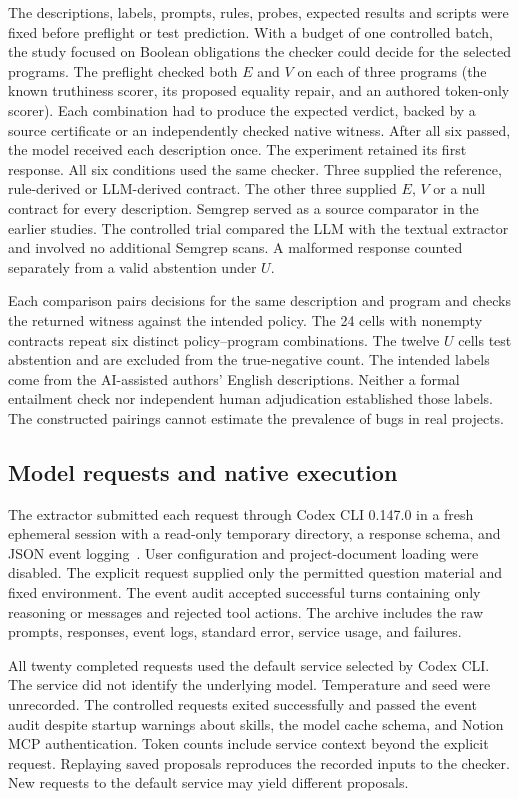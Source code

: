 \documentclass[sigconf]{acmart}
\begin{document}
The descriptions, labels, prompts, rules, probes, expected results and scripts were fixed before preflight or test prediction. With a budget of one controlled batch, the study focused on Boolean obligations the checker could decide for the selected programs. The preflight checked both $E$ and $V$ on each of three programs (the known truthiness scorer, its proposed equality repair, and an authored token-only scorer). Each combination had to produce the expected verdict, backed by a source certificate or an independently checked native witness. After all six passed, the model received each description once. The experiment retained its first response. All six conditions used the same checker. Three supplied the reference, rule-derived or LLM-derived contract. The other three supplied $E$, $V$ or a null contract for every description. Semgrep served as a source comparator in the earlier studies. The controlled trial compared the LLM with the textual extractor and involved no additional Semgrep scans. A malformed response counted separately from a valid abstention under $U$.

Each comparison pairs decisions for the same description and program and checks the returned witness against the intended policy. The 24 cells with nonempty contracts repeat six distinct policy--program combinations. The twelve $U$ cells test abstention and are excluded from the true-negative count. The intended labels come from the AI-assisted authors' English descriptions. Neither a formal entailment check nor independent human adjudication established those labels. The constructed pairings cannot estimate the prevalence of bugs in real projects.

\subsection{Model requests and native execution}

The extractor submitted each request through Codex CLI 0.147.0 in a fresh ephemeral session with a read-only temporary directory, a response schema, and JSON event logging~\cite{codexexec}. User configuration and project-document loading were disabled. The explicit request supplied only the permitted question material and fixed environment. The event audit accepted successful turns containing only reasoning or messages and rejected tool actions. The archive includes the raw prompts, responses, event logs, standard error, service usage, and failures.

All twenty completed requests used the default service selected by Codex CLI. The service did not identify the underlying model. Temperature and seed were unrecorded. The controlled requests exited successfully and passed the event audit despite startup warnings about skills, the model cache schema, and Notion MCP authentication. Token counts include service context beyond the explicit request. Replaying saved proposals reproduces the recorded inputs to the checker. New requests to the default service may yield different proposals.
\end{document}
